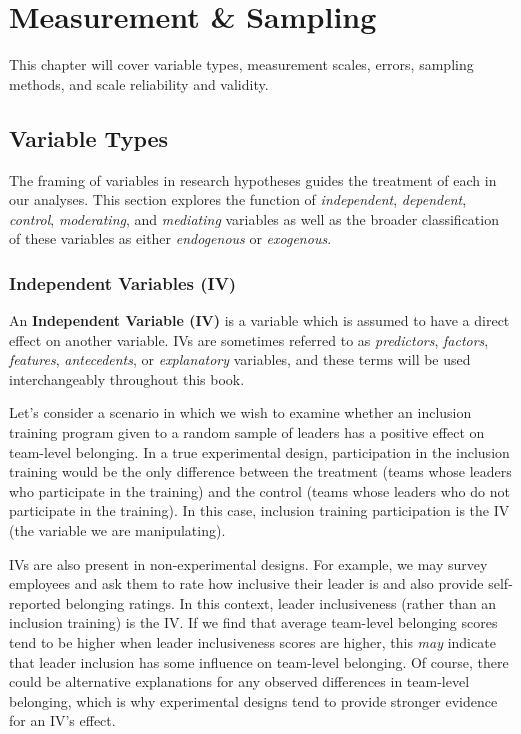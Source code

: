 \documentclass[
]{book}
\begin{document}
\hypertarget{measure-sampl}{%
\chapter{Measurement \& Sampling}\label{measure-sampl}}

This chapter will cover variable types, measurement scales, errors, sampling methods, and scale reliability and validity.

\hypertarget{variable-types}{%
\section{Variable Types}\label{variable-types}}

The framing of variables in research hypotheses guides the treatment of each in our analyses. This section explores the function of \emph{independent}, \emph{dependent}, \emph{control}, \emph{moderating}, and \emph{mediating} variables as well as the broader classification of these variables as either \emph{endogenous} or \emph{exogenous}.

\hypertarget{independent-variables-iv}{%
\subsection{Independent Variables (IV)}\label{independent-variables-iv}}

An \textbf{Independent Variable (IV)} is a variable which is assumed to have a direct effect on another variable. IVs are sometimes referred to as \emph{predictors}, \emph{factors}, \emph{features}, \emph{antecedents}, or \emph{explanatory} variables, and these terms will be used interchangeably throughout this book.

Let's consider a scenario in which we wish to examine whether an inclusion training program given to a random sample of leaders has a positive effect on team-level belonging. In a true experimental design, participation in the inclusion training would be the only difference between the treatment (teams whose leaders who participate in the training) and the control (teams whose leaders who do not participate in the training). In this case, inclusion training participation is the IV (the variable we are manipulating).

IVs are also present in non-experimental designs. For example, we may survey employees and ask them to rate how inclusive their leader is and also provide self-reported belonging ratings. In this context, leader inclusiveness (rather than an inclusion training) is the IV. If we find that average team-level belonging scores tend to be higher when leader inclusiveness scores are higher, this \emph{may} indicate that leader inclusion has some influence on team-level belonging. Of course, there could be alternative explanations for any observed differences in team-level belonging, which is why experimental designs tend to provide stronger evidence for an IV's effect.
\end{document}
